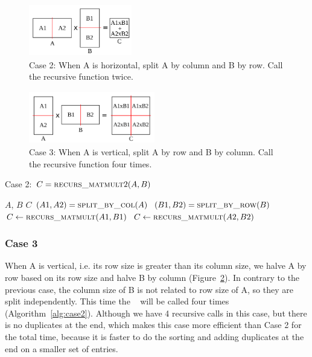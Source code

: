 \begin{figure}[tbh]
    \centering
    \includegraphics[width=4.5cm,height=2.3cm]{./figures/case2_001.pdf}
    \caption{Case 2: When A is horizontal, split A by column and B by row. Call the recursive function twice.}
    \label{fig:case2_left}
    \Description{}
\end{figure}

\begin{figure}[tbh]
    \centering
    \includegraphics[width=5.5cm,height=2.3cm]{./figures/case3_001.pdf}
    \caption{Case 3: When A is vertical, split A by row and B by column. Call the recursive function four times.}
    \label{fig:case3}
    \Description{}
\end{figure}

\begin{algorithm}[tbh] 
  \caption{Case 2: $C = \textsc{recurs\_matmult}2(A, B)$} \label{alg:case2} 
  \begin{algorithmic}[1]
    \Require $A$, $B$
    \Ensure  $C$
    \State $(A1, A2) = \textsc{split\_by\_col}(A)$
    \State $(B1, B2) = \textsc{split\_by\_row}(B)$
    \State $C \leftarrow \textsc{recurs\_matmult}(A1,B1)$
    \State $C \leftarrow \textsc{recurs\_matmult}(A2,B2)$
  \end{algorithmic}
  \Description{}
\end{algorithm}

\subsubsection{Case 3}
\label{sec:case3}
When A is vertical, i.e. its row size is greater than its column size, we halve A by row based on its row size and halve B by column (Figure~\ref{fig:case3}). In contrary to the previous case, the column size of B is not related to row size of A, so they are split independently. This time the \recmm~ will be called four times (Algorithm~\ref{alg:case2}).  Although we have 4 recursive calls in this case, but there is no duplicates at the end, which makes this case more efficient than Case 2 for the total time, because it is faster to do the sorting and adding duplicates at the end on a smaller set of entries. 

